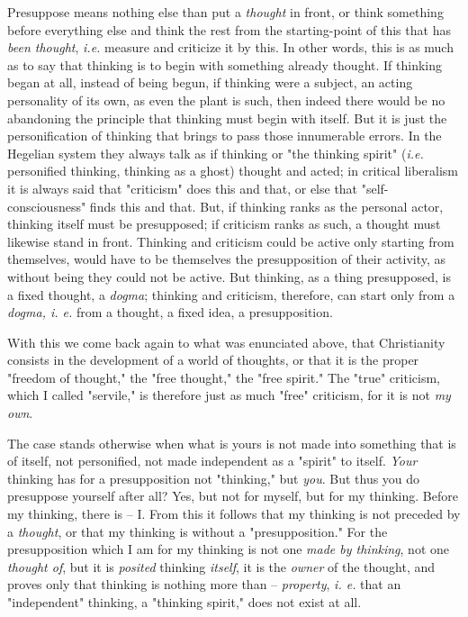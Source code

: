 \documentclass[a4paper]{book}
\begin{document}
Presuppose means nothing else than put a \textit{thought} in front, or think 
something before everything else and think the rest from the starting-point of 
this that has \textit{been thought}, \textit{i.e.} measure and criticize it by 
this. In other words, this is as much as to say that thinking is to begin with 
something already thought. If thinking began at all, instead of being begun, 
if thinking were a subject, an acting personality of its own, as even the 
plant is such, then indeed there would be no abandoning the principle that 
thinking must begin with itself. But it is just the personification of 
thinking that brings to pass those innumerable errors. In the Hegelian system 
they always talk as if thinking or "{}the thinking spirit"{} (\textit{i.e.} 
personified thinking, thinking as a ghost) thought and acted; in critical 
liberalism it is always said that "{}criticism"{} does this and that, or else 
that "{}self- consciousness"{} finds this and that. But, if thinking ranks as 
the personal actor, thinking itself must be presupposed; if criticism ranks as 
such, a thought must likewise stand in front. Thinking and criticism could be 
active only starting from themselves, would have to be themselves the 
presupposition of their activity, as without being they could not be active. 
But thinking, as a thing presupposed, is a fixed thought, a \textit{dogma}; 
thinking and criticism, therefore, can start only from a \textit{dogma, i. e.} 
from a thought, a fixed idea, a presupposition.

With this we come back again to what was enunciated above, that Christianity 
consists in the development of a world of thoughts, or that it is the proper 
"{}freedom of thought,"{} the "{}free thought,"{} the "{}free spirit."{} The 
"{}true"{} criticism, which I called "{}servile,"{} is therefore just as much 
"{}free"{} criticism, for it is not \textit{my own}.

The case stands otherwise when what is yours is not made into something that 
is of itself, not personified, not made independent as a "{}spirit"{} to 
itself. \textit{Your} thinking has for a presupposition not "{}thinking,"{} 
but \textit{you}. But thus you do presuppose yourself after all? Yes, but not 
for myself, but for my thinking. Before my thinking, there is -- I. From this 
it follows that my thinking is not preceded by a \textit{thought}, or that my 
thinking is without a "{}presupposition."{} For the presupposition which I am 
for my thinking is not one \textit{made by thinking}, not one \textit{thought 
of}, but it is \textit{posited} thinking \textit{itself}, it is the 
\textit{owner} of the thought, and proves only that thinking is nothing more 
than -- \textit{property}, \textit{i. e.} that an "{}independent"{} thinking, 
a "{}thinking spirit,"{} does not exist at all.
\end{document}
